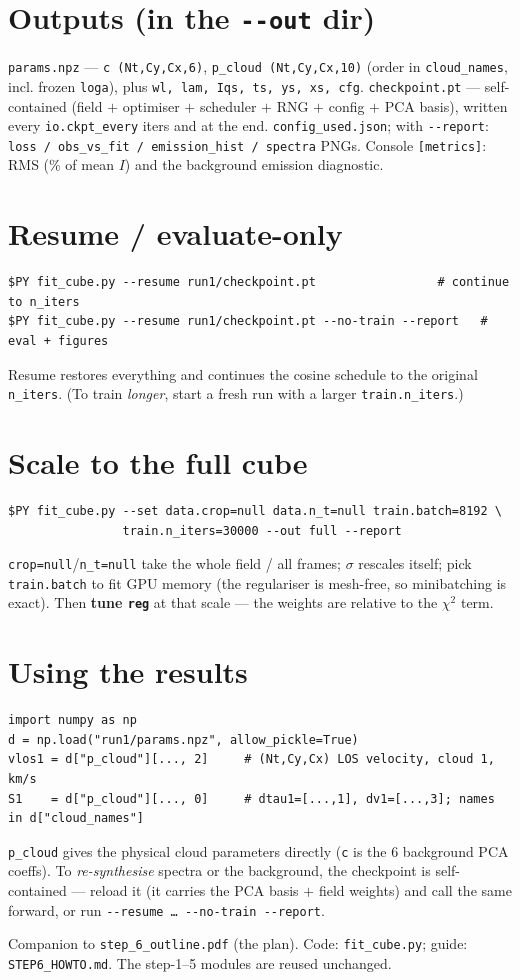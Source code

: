 \documentclass[10pt,a4paper]{article}
\newcommand{\co}[1]{{\small\texttt{#1}}}
\begin{document}
\section{Outputs (in the \texttt{-{}-out} dir)}
\co{params.npz} --- \co{c (Nt,Cy,Cx,6)}, \co{p\_cloud (Nt,Cy,Cx,10)} (order in \co{cloud\_names}, incl. frozen \co{loga}), plus \co{wl, lam, Iqs, ts, ys, xs, cfg}. \co{checkpoint.pt} --- self-contained (field $+$ optimiser $+$ scheduler $+$ RNG $+$ config $+$ PCA basis), written every \co{io.ckpt\_every} iters and at the end. \co{config\_used.json}; with \co{-{}-report}: \co{loss / obs\_vs\_fit / emission\_hist / spectra} PNGs. Console \co{[metrics]}: RMS (\% of mean $I$) and the background emission diagnostic.

\section{Resume / evaluate-only}
{\small
\begin{verbatim}
$PY fit_cube.py --resume run1/checkpoint.pt                 # continue to n_iters
$PY fit_cube.py --resume run1/checkpoint.pt --no-train --report   # eval + figures
\end{verbatim}
}
Resume restores everything and continues the cosine schedule to the original \co{n\_iters}. (To train \emph{longer}, start a fresh run with a larger \co{train.n\_iters}.)

\section{Scale to the full cube}
{\small
\begin{verbatim}
$PY fit_cube.py --set data.crop=null data.n_t=null train.batch=8192 \
                train.n_iters=30000 --out full --report
\end{verbatim}
}
\co{crop=null}/\co{n\_t=null} take the whole field / all frames; $\sigma$ rescales itself; pick \co{train.batch} to fit GPU memory (the regulariser is mesh-free, so minibatching is exact). Then \textbf{tune \co{reg}} at that scale --- the weights are relative to the $\chi^2$ term.

\section{Using the results}
{\small
\begin{verbatim}
import numpy as np
d = np.load("run1/params.npz", allow_pickle=True)
vlos1 = d["p_cloud"][..., 2]     # (Nt,Cy,Cx) LOS velocity, cloud 1, km/s
S1    = d["p_cloud"][..., 0]     # dtau1=[...,1], dv1=[...,3]; names in d["cloud_names"]
\end{verbatim}
}
\co{p\_cloud} gives the physical cloud parameters directly (\co{c} is the 6 background PCA coeffs). To \emph{re-synthesise} spectra or the background, the checkpoint is self-contained --- reload it (it carries the PCA basis $+$ field weights) and call the same forward, or run \co{-{}-resume \ldots{} -{}-no-train -{}-report}.

\vspace{1pt}{\footnotesize\color{gry}\rule{\textwidth}{0.4pt}}
{\sffamily\color{gry}\footnotesize Companion to \co{step\_6\_outline.pdf} (the plan). Code: \co{fit\_cube.py}; guide: \co{STEP6\_HOWTO.md}. The step-1--5 modules are reused unchanged.}
\end{document}

